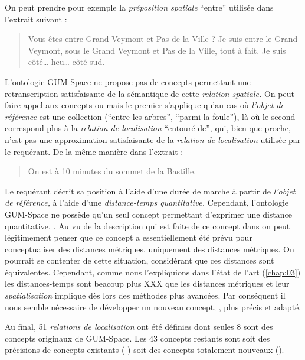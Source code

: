 On peut prendre pour exemple la \emph{préposition spatiale}
\enquote{entre} utilisée dans l'extrait suivant :
%
\begin{quote}
  \begin{dialogue}
    \Sec Vous êtes entre Grand Veymont et Pas de la Ville ?  \Req Je
    suis entre le Grand Veymont, sous le Grand Veymont et Pas de la
    Ville, tout à fait. Je suis côté… heu… côté sud.
  \end{dialogue}
\end{quote}
%
L'ontologie GUM-Space ne propose pas de concepts permettant une
retranscription satisfaisante de la sémantique de cette \emph{relation
  spatiale.} On peut faire appel aux concepts
 ou  mais le
premier s'applique qu'au cas où \emph{l'objet de référence} est une
collection (\eg \enquote{entre les arbres}, \enquote{parmi la foule}),
là où le second correspond plus à la \emph{relation de localisation}
\enquote{entouré de}, qui, bien que proche, n'est pas une
approximation satisfaisante de la \emph{relation de localisation}
utilisée par le requérant. De la même manière dans l'extrait :
%
\begin{quote}
  \begin{dialogue}
    \Req On est à 10 minutes du sommet de la Bastille.
  \end{dialogue}
\end{quote}
%
Le requérant décrit sa position à l'aide d'une durée de marche à
partir de \emph{l'objet de référence,} \ie à l'aide d'une
\emph{distance-temps quantitative.} Cependant, l'ontologie GUM-Space
ne possède qu'un seul concept permettant d'exprimer une distance
quantitative, . Au vu de la
description qui est faite de ce concept dans \textcite{Bateman2010} on
peut légitimement penser que ce concept a essentiellement été prévu
pour conceptualiser des distances métriques, uniquement des distances
métriques. On pourrait se contenter de cette situation, considérant
que ces distances sont équivalentes. Cependant, comme nous
l'expliquions dans l'état de l'art (\autoref{chap:03}) les
distances-temps sont beacoup plus XXX que les distances métriques et
leur \emph{spatialisation} implique dès lors des méthodes plus
avancées. Par conséquent il nous semble nécessaire de développer un
nouveau concept, , plus précis et adapté.

Au final, 51 \emph{relations de localisation} ont été définies dont
seules 8 sont des concepts originaux de GUM-Space. Les 43 concepts
restants sont soit des précisions de concepts existants (\eg
{}) soit des concepts totalement nouveaux
(\eg {}).

